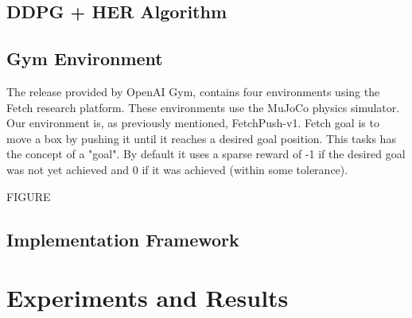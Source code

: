 \documentclass[a4paper]{report}
\begin{document}
\section{DDPG + HER Algorithm}


\section{Gym Environment}
The release provided by OpenAI Gym, contains four environments using the Fetch research platform. These environments use the MuJoCo physics simulator. Our environment is, as previously mentioned, FetchPush-v1. Fetch goal is to move a box by pushing it until it reaches a desired goal position. This tasks has the concept of a "goal". By default it uses a sparse reward of -1 if the desired goal was not yet achieved and 0 if it was achieved (within some tolerance).

FIGURE

\section{Implementation Framework}

\chapter{Experiments and Results \label{exp}}
\end{document}
